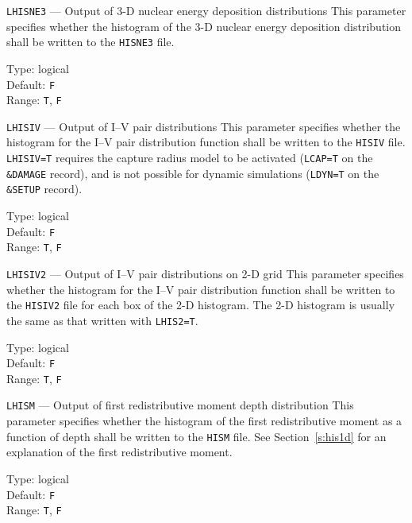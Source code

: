 \begin{keydescription}{\texttt{LHISNE3} --- Output of 3-D nuclear energy deposition distributions}
%
  This parameter specifies whether the histogram of the 3-D nuclear energy
  deposition distribution shall be written to the \texttt{HISNE3} file.
  \begin{keytab}
    Type:    \> logical \\
    Default: \> \texttt{F} \\
    Range:   \> \texttt{T}, \texttt{F} 
  \end{keytab}
\end{keydescription}

\begin{keydescription}{\texttt{LHISIV} --- Output of I--V pair distributions}
%
  This parameter specifies whether the histogram for the I--V pair distribution function shall 
  be written to the \texttt{HISIV} file. \texttt{LHISIV=T} requires the capture radius model to 
  be activated (\texttt{LCAP=T} on the \texttt{\&DAMAGE} record), and is not possible for 
  dynamic simulations (\texttt{LDYN=T} on the \texttt{\&SETUP} record).
  \begin{keytab}
    Type:    \> logical \\
    Default: \> \texttt{F} \\
    Range:   \> \texttt{T}, \texttt{F} 
  \end{keytab}
\end{keydescription}

\ifprivate
\begin{keydescription}{\texttt{LHISIV2} --- Output of I--V pair distributions on 2-D grid}
%
  This parameter specifies whether the histogram for the I--V pair distribution
  function shall be written to the \texttt{HISIV2} file for each box of the 2-D
  histogram. The 2-D histogram is usually the same as that written with
  \texttt{LHIS2=T}.
  \begin{keytab}
    Type:    \> logical \\
    Default: \> \texttt{F} \\
    Range:   \> \texttt{T}, \texttt{F} 
  \end{keytab}
\end{keydescription}
\fi

\begin{keydescription}{\texttt{LHISM} --- Output of first redistributive moment depth
    distribution}
%
  This parameter specifies whether the histogram of the first redistributive moment as a 
  function of depth shall be written to the \texttt{HISM} file. See Section~\ref{s:his1d} for 
  an explanation of the first redistributive moment. 
  \begin{keytab}
    Type:    \> logical \\
    Default: \> \texttt{F} \\
    Range:   \> \texttt{T}, \texttt{F} 
  \end{keytab}
\end{keydescription}

